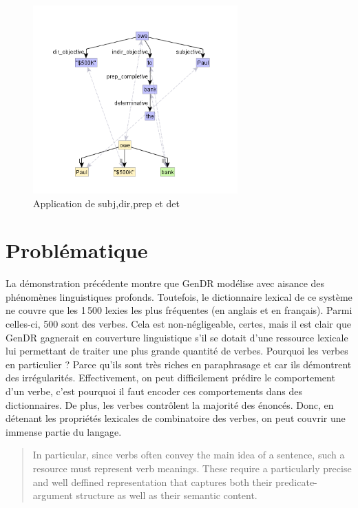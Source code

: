 \begin{figure}[htb]
	\centering
	\includegraphics[width=0.7\textwidth, trim = {0cm 0cm 0cm 0cm},clip]{ch3/figs/rsynts_syntactisation.png}
	\caption{Application de subj,dir,prep et det}
	\label{fig:syntsurf}
\end{figure}


\section{Problématique}\label{sec:problema}

La démonstration précédente montre que GenDR modélise avec aisance des phénomènes linguistiques profonds. Toutefois, le dictionnaire lexical de ce système ne couvre que les 1\,500 lexies les plus fréquentes (en anglais et en français). Parmi celles-ci, 500 sont des verbes. Cela est non-négligeable, certes, mais il est clair que GenDR gagnerait en couverture linguistique s'il se dotait d'une ressource lexicale lui permettant de traiter une plus grande quantité de verbes. Pourquoi les verbes en particulier ? Parce qu'ils sont très riches en paraphrasage et car ils démontrent des irrégularités. Effectivement, on peut difficilement prédire le comportement d'un verbe, c'est pourquoi il faut encoder ces comportements dans des dictionnaires. De plus, les verbes contrôlent la majorité des énoncés. Donc, en détenant les propriétés lexicales de combinatoire des verbes, on peut couvrir une immense partie du langage.

\begin{quote}
In particular, since verbs often convey the main idea of a sentence, such a resource must represent verb meanings. These require a particularly precise and well deffined representation that captures both their predicate-argument structure as well as their semantic content.
\end{quote}
\vspace{-\baselineskip}
\hfill
\cite{SchulerVerbnetBroadcoverageComprehensive2005}

